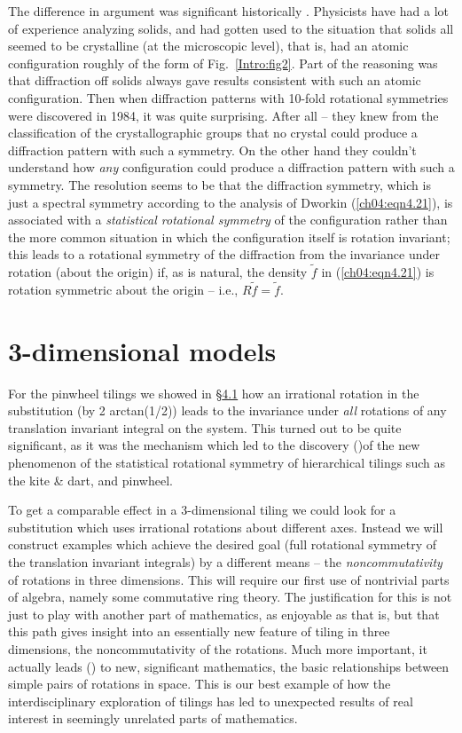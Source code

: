 \documentclass[reqno]{stml-l}
\theoremstyle{plain}
\theoremstyle{definition}
\numberwithin{equation}{chapter}
\begin{document}
The difference in argument was significant historically \cite{bib:StO,bib:Sen}. Physicists have had a lot of experience analyzing solids, and had gotten used to the situation that solids all seemed to be crystalline (at the microscopic level), that is, had an atomic configuration roughly of the form of Fig.~\ref{Intro:fig2}. Part of the reasoning was that diffraction off solids always gave results consistent with such an atomic configuration. Then when diffraction patterns with 10-fold rotational symmetries were discovered in 1984, it was quite surprising. After all -- they knew from the classification of the crystallographic groups \cite[p. 149]{bib:NiS} that no crystal could produce a diffraction pattern with such a symmetry. On the other hand they couldn't understand how \emph{any} configuration could produce a diffraction pattern with such a symmetry. The resolution seems to be that the diffraction symmetry, which is just a spectral symmetry according to the analysis of Dworkin (\ref{ch04:eqn4.21}), is associated with a \emph{statistical rotational symmetry} of the configuration rather than the more common situation in which the configuration itself is rotation invariant; this leads to a rotational symmetry of the diffraction from the invariance under rotation (about the origin) if, as is natural,
the density $\tilde{f}$ in (\ref{ch04:eqn4.21}) is rotation symmetric about the origin
-- i.e., $R\tilde{f} = \tilde{f}$.

\section{3-dimensional models}\label{ch04:sec3}

For the pinwheel tilings we showed in \S \hyperref[ch04:sec1]{4.1} how an irrational rotation in the substitution (by 2 arctan(1/2)) leads to the invariance under \emph{all} rotations of any translation invariant integral on the system. This turned out to be quite significant, as it was the mechanism which led to the discovery (\cite{bib:Ra4})of the new phenomenon of the statistical rotational symmetry of hierarchical tilings such as the kite \& dart, and pinwheel.

To get a comparable effect in a 3-dimensional tiling we could look for a substitution which uses irrational rotations about different axes. Instead we will construct examples which achieve the desired goal (full rotational symmetry of the translation invariant integrals) by a different means --
the \emph{noncommutativity} of rotations in three dimensions. This will require our first use of nontrivial parts of algebra, namely some commutative ring theory. The justification for this is not just to play with another part of mathematics, as enjoyable as that is, but that this path gives insight into an essentially new feature of tiling in three dimensions, the noncommutativity of the rotations. Much more important, it actually leads (\cite{bib:CoR,bib:RS1,bib:RS2}) to new, significant mathematics, the basic relationships between simple pairs of rotations in space. This is our best example of how the interdisciplinary exploration of tilings has led to unexpected results of real interest in seemingly unrelated parts of mathematics.
\end{document}
